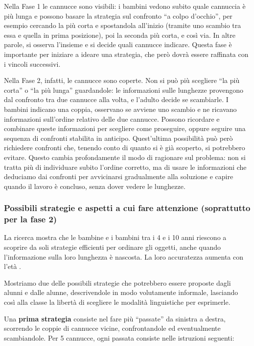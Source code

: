 Nella Fase 1 le cannucce sono visibili: i bambini vedono subito quale cannuccia è più lunga e possono basare la strategia sul confronto ``a colpo d'occhio'', per esempio cercando la più corta e spostandola all'inizio (tramite uno scambio tra essa e quella in prima posizione), poi la seconda più corta, e così via. In altre parole, si osserva l'insieme e si decide quali cannucce indicare. Questa fase è importante per iniziare a ideare una strategia, che però dovrà essere raffinata con i vincoli successivi.

Nella Fase 2, infatti, le cannucce sono coperte. Non si può più scegliere ``la più corta'' o ``la più lunga'' guardandole: le informazioni sulle lunghezze provengono dal confronto tra due cannucce alla volta, e l'adulto decide se scambiarle. I bambini indicano una coppia, osservano se avviene uno scambio e ne ricavano informazioni sull'ordine relativo delle due cannucce. Possono ricordare e combinare queste informazioni per scegliere come proseguire, oppure seguire una sequenza di confronti stabilita in anticipo. Quest'ultima possibilità può però richiedere confronti che, tenendo conto di quanto si è già scoperto, si potrebbero evitare. Questo cambia profondamente il modo di ragionare sul problema: non si tratta più di individuare subito l'ordine corretto, ma di usare le informazioni che deduciamo dai confronti per avvicinarsi gradualmente alla soluzione e capire quando il lavoro è concluso, senza dover vedere le lunghezze.

\subsubsection{Possibili strategie e aspetti a cui fare attenzione (soprattutto per la fase 2)}\label{possibili-strategie-e-aspetti-a-cui-fare-attenzione-soprattutto-per-la-fase-2}

La ricerca mostra che le bambine e i bambini tra i 4 e i 10 anni riescono a scoprire da soli strategie efficienti per ordinare gli oggetti, anche quando l'informazione sulla loro lunghezza è nascosta. La loro accuratezza aumenta con l'età \parencite{yang-etal-2025}.

Mostriamo due delle possibili strategie che potrebbero essere proposte dagli alunni e dalle alunne, descrivendole in modo volutamente informale, lasciando così alla classe la libertà di scegliere le modalità linguistiche per esprimerle.

Una \textbf{prima strategia} consiste nel fare più ``passate'' da sinistra a destra, scorrendo le coppie di cannucce vicine, confrontandole ed eventualmente scambiandole. Per 5 cannucce, ogni passata consiste nelle istruzioni seguenti:

